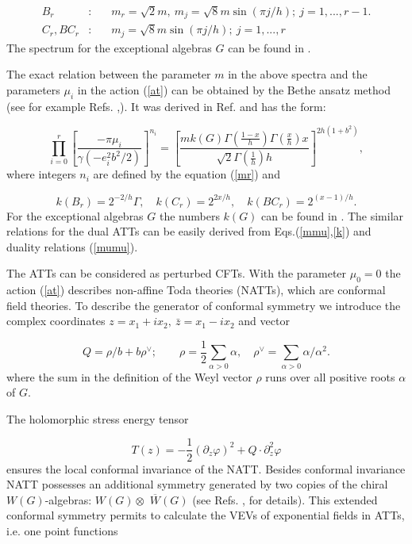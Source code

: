 \documentclass[a4paper,12pt,titlepage,final]{article}
\begin{document}
\begin{eqnarray}
B_{r} &:&\quad m_{r}=\sqrt{2}m,~m_{j}=\sqrt{8}m\sin (\pi j/h);~j=1,...,r-1.
\nonumber \\
C_{r},BC_{r} &:&\quad m_{j}=\sqrt{8}m\sin (\pi j/h);~j=1,...,r  \label{spr}
\end{eqnarray}
The spectrum for the exceptional algebras $G$ can be found in \cite{DGZ}.

The exact relation between the parameter $m$ in the above spectra and the
parameters $\mu _{i}$ in the action (\ref{at}) can be obtained by the Bethe
ansatz method (see for example Refs. \cite{ALZ},\cite{F}). It was derived in
Ref.\cite{ABF} and has the form:

\begin{equation}
\prod_{i=0}^{r}\left[ \frac{-\pi \mu _{i}}{\gamma
(-e_{i}^{2}b^{2}/2)}\right]
^{n_{i}}=\left[ \frac{mk(G)\Gamma \left( \frac{1-x}{h}\right) \Gamma \left(
\frac{x}{h}\right) x}{\sqrt{2}\Gamma \left( \frac{1}{h}\right) h}\right]
^{2h(1+b^{2})},  \label{mmu}
\end{equation}
where integers $n_{i}$ are defined by the equation (\ref{mr}) and

\begin{equation}
k(B_{r})=2^{-2/h}\Gamma ,\quad k(C_{r})=2^{2x/h},\quad
k(BC_{r})=2^{(x-1)/h}.
\label{k}
\end{equation}
For the exceptional algebras $G$ the numbers $k(G)$ can be found in \cite
{ABF}. The similar relations for the dual ATTs can be easily derived from
Eqs.(\ref{mmu},\ref{k}) and duality relations (\ref{mumu}).

The ATTs can be considered as perturbed CFTs. With the parameter
$\mu_{0}=0$ the action (\ref{at}) describes non-affine Toda theories
(NATTs), which are conformal field theories. To describe the generator
of conformal symmetry we introduce the complex coordinates
$z=x_{1}+ix_{2},\ \bar{z}=x_{1}-ix_{2}$ and vector

\begin{equation}
Q=\rho /b+b\rho ^{\vee };\qquad \rho =\frac{1}{2}\sum_{\alpha >0}\alpha
,\quad \rho ^{\vee }=\sum_{\alpha >0}\alpha /\alpha^{2}. 
\label{q}
\end{equation}
where the sum in the definition of the Weyl vector $\rho $ runs over all
positive roots $\alpha $ of $G.$

The holomorphic stress energy tensor

\begin{equation}
T(z)=-\frac{1}{2}(\partial _{z}\varphi )^{2}+Q\cdot \partial _{z}^{2}\varphi
\label{se}
\end{equation}
ensures the local conformal invariance of the NATT. Besides conformal
invariance NATT possesses an additional symmetry generated by two copies of
the chiral $W(G)$-algebras: $W(G)\otimes $ $\overline{W}(G)$ (see Refs.
\cite
{FL},\cite{VFT} for details). This extended conformal symmetry permits to
calculate the VEVs of exponential fields in ATTs, i.e. one point functions
\end{document}
